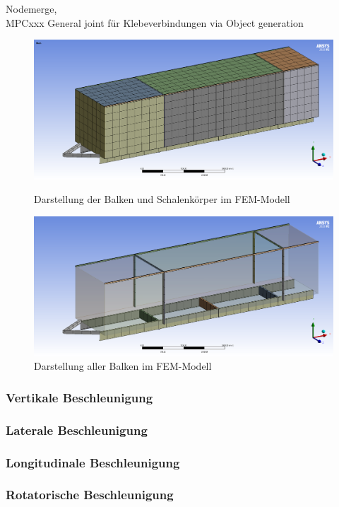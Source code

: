 Nodemerge,\\
MPCxxx General joint für Klebeverbindungen via Object generation

\begin{figure}[h]
\centering
\begin{minipage}{.5\textwidth}
  \centering
  \includegraphics[width=.98\linewidth]{04_figures/FEM Mesh1.png}
  \caption{Darstellung der Balken und Schalenkörper im FEM-Modell}
  \label{FEM Mesh1}
\end{minipage}%
\begin{minipage}{.5\textwidth}
  \centering
  \includegraphics[width=.98\linewidth]{04_figures/FEM Mesh3.png}
  \caption{Darstellung aller Balken im FEM-Modell}
  \label{FEM Mesh3}
\end{minipage}
\end{figure}



\subsubsection*{Vertikale Beschleunigung}


\subsubsection*{Laterale Beschleunigung}


\subsubsection*{Longitudinale Beschleunigung}


\subsubsection*{Rotatorische Beschleunigung}









\newpage
